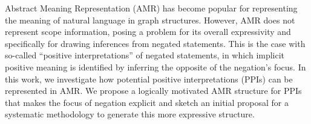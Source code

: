 Abstract Meaning Representation (AMR) has become popular for representing the meaning of natural language in graph structures. However, AMR does not represent scope information, posing a problem for its overall expressivity and specifically for drawing inferences from negated statements. This is the case with so-called ``positive interpretations'' of negated statements, in which implicit positive meaning is identified by inferring the opposite of the negation's focus. In this work, we investigate how potential positive interpretations (PPIs) can be represented in AMR. We propose a logically motivated AMR structure for PPIs that makes the focus of negation explicit and sketch an initial proposal for a systematic methodology to generate this more expressive structure.
